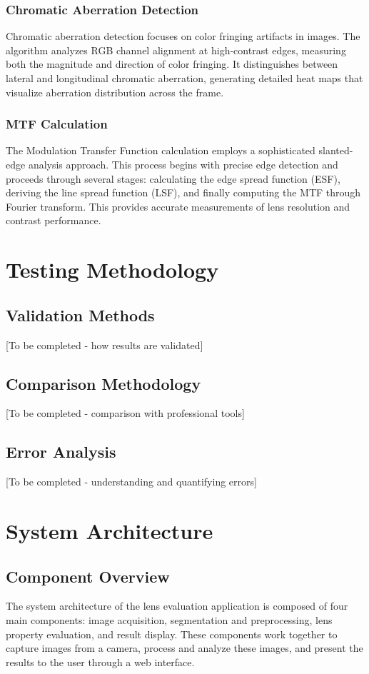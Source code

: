 \subsubsection{Chromatic Aberration Detection}
Chromatic aberration detection focuses on color fringing artifacts in images. The algorithm analyzes RGB channel alignment at high-contrast edges, measuring both the magnitude and direction of color fringing. It distinguishes between lateral and longitudinal chromatic aberration, generating detailed heat maps that visualize aberration distribution across the frame.

\subsubsection{MTF Calculation}
The Modulation Transfer Function calculation employs a sophisticated slanted-edge analysis approach. This process begins with precise edge detection and proceeds through several stages: calculating the edge spread function (ESF), deriving the line spread function (LSF), and finally computing the MTF through Fourier transform. This provides accurate measurements of lens resolution and contrast performance.

\section{Testing Methodology}

\subsection{Validation Methods}
[To be completed - how results are validated]

\subsection{Comparison Methodology}
[To be completed - comparison with professional tools]

\subsection{Error Analysis}
[To be completed - understanding and quantifying errors]

\section{System Architecture}

\subsection{Component Overview}
The system architecture of the lens evaluation application is composed of four main components: image acquisition, segmentation and preprocessing, lens property evaluation, and result display. These components work together to capture images from a camera, process and analyze these images, and present the results to the user through a web interface.


